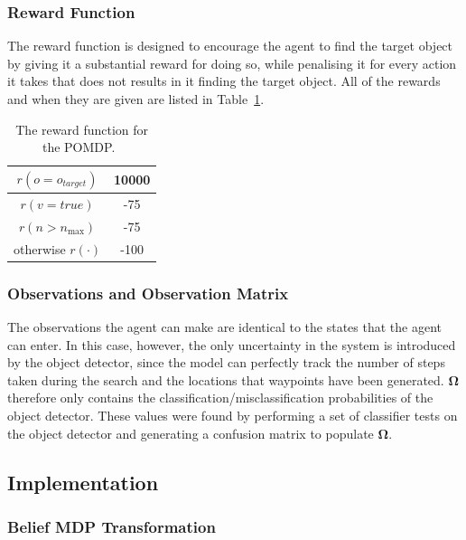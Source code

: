 \documentclass[runningheads]{llncs}
\begin{document}
\subsubsection{Reward Function}

The reward function is designed to encourage the agent to find the target object by giving it a substantial reward for doing so, while penalising it for every action it takes that does not results in it finding the target object.
All of the rewards and when they are given are listed in Table~\ref{tab:rewards}.

\begin{table}
  \centering
  \caption{The reward function for the POMDP.\ }\label{tab:rewards}
  \begin{tabular}{cc}
    \toprule
    $r(o = o_{target})$ & 10000 \\ \midrule
    $r(v = true)$  & -75 \\ \midrule
    $r(n > n_{\max})$ & -75 \\ \midrule
    otherwise $r(\cdot)$ & -100  \\ \midrule
    \bottomrule
  \end{tabular}
\end{table}

\subsubsection{Observations and Observation Matrix}

The observations the agent can make are identical to the states that the agent can enter. 
In this case, however, the only uncertainty in the system is introduced by the object detector, since the model can perfectly track the number of steps taken during the search and the locations that waypoints have been generated.
$\mathbf{\Omega}$ therefore only contains the classification/misclassification probabilities of the object detector. 
These values were found by performing a set of classifier tests on the object detector and generating a confusion matrix to populate $\mathbf{\Omega}$.

\subsection{Implementation}

\subsubsection{Belief MDP Transformation}
\end{document}
